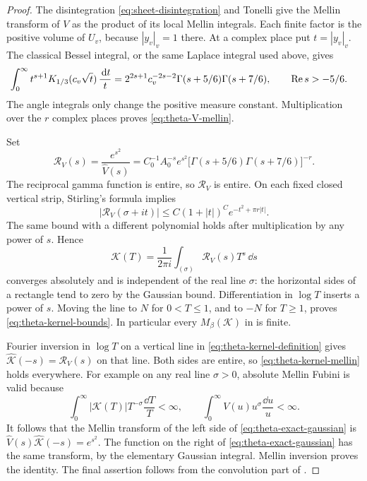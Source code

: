 \begin{proof}
The disintegration \eqref{eq:sheet-disintegration} and Tonelli give
the Mellin transform of \(V\) as the product of its local Mellin
integrals.  Each finite factor is the positive volume of \(U_v\),
because \(|y_v|_v=1\) there.  At a complex place put \(t=|y_v|_v\).
The classical Bessel integral, or the same Laplace integral used
above, gives
\begin{align}
 \int_0^\infty t^{s+1}K_{1/3}(c_v\sqrt t)\,\frac{\,\mathrm{d} t}{t}
 &=2^{2s+1}c_v^{-2s-2}
       \Gamma(s+5/6)\Gamma(s+7/6),
       \qquad \operatorname{Re} s>-5/6.                         \label{eq:theta-bessel-mellin}
\end{align}
The angle integrals only change the positive measure constant.
Multiplication over the \(r\) complex places proves
\eqref{eq:theta-V-mellin}.

Set
\[
 \mathcal R_V(s)=\frac{e^{s^2}}{\widehat V(s)}
   =C_0^{-1}A_0^{-s}e^{s^2}
       \bigl[\Gamma(s+5/6)\Gamma(s+7/6)\bigr]^{-r}.
\]
The reciprocal gamma function is entire, so \(\mathcal R_V\) is
entire.  On each fixed closed vertical strip, Stirling's formula
implies
\[
 |\mathcal R_V(\sigma+it)|
   \le C(1+|t|)^C e^{-t^2+\pi r|t|}.
\]
The same bound with a different polynomial holds after
multiplication by any power of \(s\).  Hence
\begin{equation}\label{eq:theta-kernel-definition}
 \mathcal K(T)=\frac{1}{2\pi i}\int_{(\sigma)}
                   \mathcal R_V(s)T^s\,\dd s
\end{equation}
converges absolutely and is independent of the real line
\(\sigma\): the horizontal sides of a rectangle tend to zero by the
Gaussian bound.  Differentiation in \(\log T\) inserts a power of
\(s\).  Moving the line to \(N\) for \(0<T\le1\), and to \(-N\)
for \(T\ge1\), proves \eqref{eq:theta-kernel-bounds}.
In particular every \(M_\beta(\mathcal K)\) in
 is finite.

Fourier inversion in \(\log T\) on a vertical line in
\eqref{eq:theta-kernel-definition} gives
\(\widehat{\mathcal K}(-s)=\mathcal R_V(s)\) on that line.
Both sides are entire, so \eqref{eq:theta-kernel-mellin} holds
everywhere.  For example on any real line \(\sigma>0\), absolute
Mellin Fubini is valid because
\[
 \int_0^\infty|\mathcal K(T)|T^{-\sigma}\frac{\dd T}{T}<\infty,
 \qquad
 \int_0^\infty V(u)u^\sigma\frac{\dd u}{u}<\infty.
\]
It follows that the Mellin transform of the left side of
\eqref{eq:theta-exact-gaussian} is
\(\widehat V(s)\widehat{\mathcal K}(-s)=e^{s^2}\).
The function on the right of \eqref{eq:theta-exact-gaussian} has
the same transform, by the elementary Gaussian integral.
Mellin inversion proves the identity.  The final assertion follows
from the convolution part of .
\end{proof}
